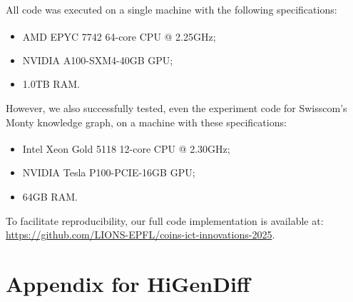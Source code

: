All code was executed on a single machine with the following specifications:
\begin{itemize}
    \item AMD EPYC\textsuperscript{\texttrademark} 7742 64-core CPU @ 2.25GHz;
    \item NVIDIA A100-SXM4-40GB GPU;
    \item 1.0TB RAM. 
\end{itemize}
However, we also successfully tested, even the experiment code for Swisscom's Monty knowledge graph, on a machine with these specifications:
\begin{itemize}
    \item Intel\textsuperscript{\textregistered} Xeon\textsuperscript{\textregistered} Gold 5118 12-core CPU @ 2.30GHz;
    \item NVIDIA Tesla P100-PCIE-16GB GPU;
    \item 64GB RAM.
\end{itemize}

To facilitate reproducibility, our full code implementation is available at:
\url{https://github.com/LIONS-EPFL/coins-ict-innovations-2025}.

\chapter{Appendix for HiGenDiff}

